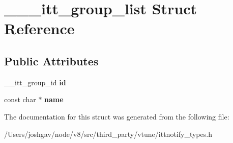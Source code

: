 \hypertarget{struct______itt__group__list}{}\section{\+\_\+\+\_\+\+\_\+itt\+\_\+group\+\_\+list Struct Reference}
\label{struct______itt__group__list}
\subsection*{Public Attributes}
\begin{DoxyCompactItemize}
\item 
\+\_\+\+\_\+itt\+\_\+group\+\_\+id {\bfseries id}\hypertarget{struct______itt__group__list_a0be1db69af1d8a515915bf594f0f9a7e}{}\label{struct______itt__group__list_a0be1db69af1d8a515915bf594f0f9a7e}

\item 
const char $\ast$ {\bfseries name}\hypertarget{struct______itt__group__list_a7ec0e147be42b6d715189f283d6d6784}{}\label{struct______itt__group__list_a7ec0e147be42b6d715189f283d6d6784}

\end{DoxyCompactItemize}


The documentation for this struct was generated from the following file\+:\begin{DoxyCompactItemize}
\item 
/\+Users/joshgav/node/v8/src/third\+\_\+party/vtune/ittnotify\+\_\+types.\+h\end{DoxyCompactItemize}

